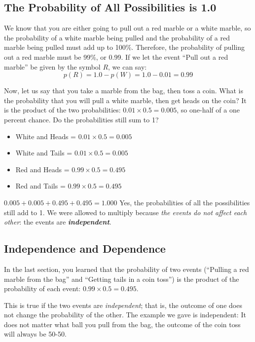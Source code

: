 \subsection{The Probability of All Possibilities is 1.0}

We know that you are either going to pull out a red marble or a white marble,
so the probability of a white marble being pulled and the probability
of a red marble being pulled must add up to 100\%. Therefore, the probability of
pulling out a red marble must be 99\%, or 0.99. If we let the event ``Pull out a red marble'' be given by the symbol $R$, we can say:
\begin{equation*}
  p(R) = 1.0 - p(W) = 1.0 - 0.01 = 0.99
\end{equation*}

Now, let us say that you take a marble from the bag, then
toss a coin. What is the probability that you will pull a white marble, then get heads on the coin? It is the product of the two
probabilities: $0.01 \times 0.5 = 0.005$, so one-half of a one percent
chance. Do the probabilities still sum to 1?
\begin{itemize}
\item White and Heads = $0.01 \times 0.5 = 0.005$
\item White and Tails = $0.01 \times 0.5 = 0.005$
\item Red and Heads = $0.99 \times 0.5 = 0.495$
\item Red and Tails = $0.99 \times 0.5 = 0.495$
\end{itemize}
$0.005 + 0.005 + 0.495 + 0.495 = 1.000$
Yes, the probabilities of all the possibilities still add to 1. We were allowed to multiply because \emph{the events do not affect each other}: the events are \textbf{\textit{independent}}. 
\subsection{Independence and Dependence}

In the last section, you learned that the probability of two events
(``Pulling a red marble from the bag'' and ``Getting tails in a coin
toss'') is the product of the probability of each event: $0.99 \times 0.5 = 0.495$.

This is true if the two events are \textit{independent}; that is, the
outcome of one does not change the probability of the other. The
example we gave is independent: It does not matter what ball you pull
from the bag, the outcome of the coin toss will always be 50-50.

